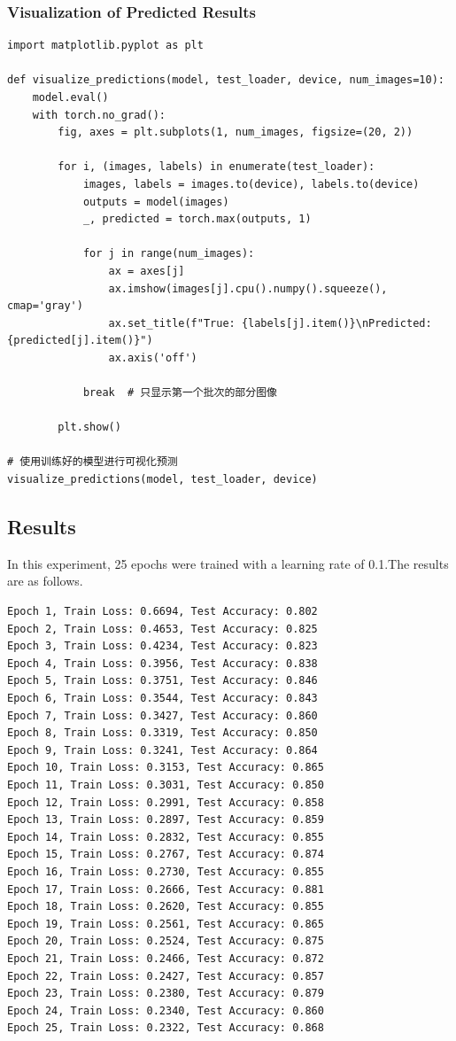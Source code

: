 \documentclass[a4paper,12pt]{article}
\begin{document}
\subsubsection{Visualization of Predicted Results}
\begin{lstlisting}
import matplotlib.pyplot as plt

def visualize_predictions(model, test_loader, device, num_images=10):
    model.eval()
    with torch.no_grad():
        fig, axes = plt.subplots(1, num_images, figsize=(20, 2))

        for i, (images, labels) in enumerate(test_loader):
            images, labels = images.to(device), labels.to(device)
            outputs = model(images)
            _, predicted = torch.max(outputs, 1)

            for j in range(num_images):
                ax = axes[j]
                ax.imshow(images[j].cpu().numpy().squeeze(), cmap='gray')
                ax.set_title(f"True: {labels[j].item()}\nPredicted: {predicted[j].item()}")
                ax.axis('off')

            break  # 只显示第一个批次的部分图像

        plt.show()

# 使用训练好的模型进行可视化预测
visualize_predictions(model, test_loader, device)
\end{lstlisting}

\subsection{Results}
In this experiment, 25 epochs were trained with a learning rate of 0.1.The results are as follows.
\begin{lstlisting}
Epoch 1, Train Loss: 0.6694, Test Accuracy: 0.802
Epoch 2, Train Loss: 0.4653, Test Accuracy: 0.825
Epoch 3, Train Loss: 0.4234, Test Accuracy: 0.823
Epoch 4, Train Loss: 0.3956, Test Accuracy: 0.838
Epoch 5, Train Loss: 0.3751, Test Accuracy: 0.846
Epoch 6, Train Loss: 0.3544, Test Accuracy: 0.843
Epoch 7, Train Loss: 0.3427, Test Accuracy: 0.860
Epoch 8, Train Loss: 0.3319, Test Accuracy: 0.850
Epoch 9, Train Loss: 0.3241, Test Accuracy: 0.864
Epoch 10, Train Loss: 0.3153, Test Accuracy: 0.865
Epoch 11, Train Loss: 0.3031, Test Accuracy: 0.850
Epoch 12, Train Loss: 0.2991, Test Accuracy: 0.858
Epoch 13, Train Loss: 0.2897, Test Accuracy: 0.859
Epoch 14, Train Loss: 0.2832, Test Accuracy: 0.855
Epoch 15, Train Loss: 0.2767, Test Accuracy: 0.874
Epoch 16, Train Loss: 0.2730, Test Accuracy: 0.855
Epoch 17, Train Loss: 0.2666, Test Accuracy: 0.881
Epoch 18, Train Loss: 0.2620, Test Accuracy: 0.855
Epoch 19, Train Loss: 0.2561, Test Accuracy: 0.865
Epoch 20, Train Loss: 0.2524, Test Accuracy: 0.875
Epoch 21, Train Loss: 0.2466, Test Accuracy: 0.872
Epoch 22, Train Loss: 0.2427, Test Accuracy: 0.857
Epoch 23, Train Loss: 0.2380, Test Accuracy: 0.879
Epoch 24, Train Loss: 0.2340, Test Accuracy: 0.860
Epoch 25, Train Loss: 0.2322, Test Accuracy: 0.868
\end{lstlisting}
\end{document}
